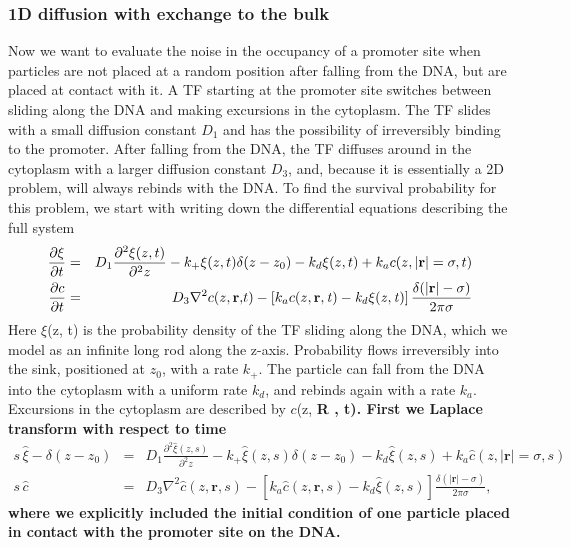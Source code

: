 \subsubsection{1D diffusion with exchange to the bulk}
Now we want to evaluate the noise in the occupancy of a promoter site when particles are not placed at a random position after falling from the DNA, but are placed at contact with it. A TF starting at the promoter site switches between sliding along the DNA and making excursions in the cytoplasm. The TF slides with a small diffusion constant $D_1$ and has the possibility of irreversibly binding to the promoter. After falling from the DNA, the TF diffuses around in the cytoplasm with a larger diffusion constant $D_3$, and, because it is essentially a 2D problem, will always rebinds with the DNA. To find the survival probability for this problem, we start with writing down the differential equations describing the full system
\setlength{\jot}{12pt}
\begin{eqnarray*}
 \frac{\partial \xi}{\partial t} & = & D_1 \frac{\partial^2\xi(z,t)}{\partial^2 z} - k_+ \xi(z,t) \delta(z - z_0) - k_d \xi(z,t) + k_a c(z, |\mathbf r \mathrm| = \sigma, t) \\
 \frac{\partial c}{\partial t} & = & D_3 \nabla^2 c(z, \mathbf r \mathrm, t) - \left[ k_a c(z, \bf r \it, t) - k_d \xi(z,t) \right] \frac{\delta(|\mathbf r \mathrm| - \sigma)}{2 \pi \sigma} 
\end{eqnarray*}
Here $\xi$(z, t) is the probability density of the TF sliding along the DNA, which we model as an infinite long rod along the z-axis. Probability flows irreversibly into the sink, positioned at $z_0$, with a rate $k_+$. The particle can fall from the DNA into the cytoplasm with a uniform rate $k_d$, and rebinds again with a rate $k_a$. Excursions in the cytoplasm are described by $c$(z, \bf R \rm, t). First we Laplace transform with respect to time
\begin{eqnarray*}
 s \, \hat{\xi} - \delta(z - z_0) & = & D_1 \frac{\partial^2\hat{\xi}(z,s)}{\partial^2 z} - k_+ \hat{\xi}(z,s) \delta(z - z_0) - k_d \hat{\xi}(z,s) + k_a \hat{c}(z, |\mathbf r \mathrm| = \sigma , s) \\
 s \, \hat{c} & = & D_3 \nabla^2 \hat{c}(z, \mathbf r \mathrm, s) - \left[ k_a \hat{c}(z, \mathbf r \mathrm, s) - k_d \hat{\xi}(z,s) \right] \frac{\delta(|\mathbf r \mathrm| - \sigma)}{2 \pi \sigma},
\end{eqnarray*}
where we explicitly included the initial condition of one particle placed in contact with the promoter site on the DNA.
